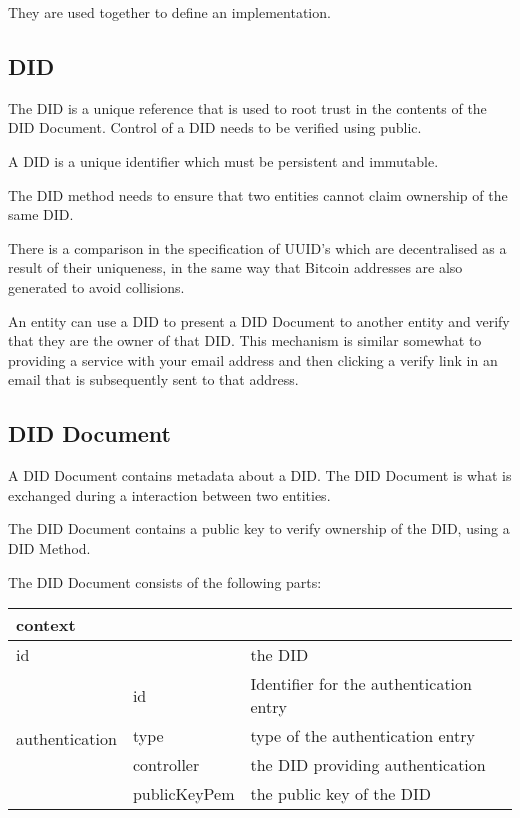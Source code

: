 \documentclass[10pt,a4paper]{runcrypto}
\begin{document}
They are used together to define an implementation.

\subsection{DID}
The DID is a unique reference that is used to root trust in the contents of the DID Document.  Control of a DID needs to be verified using public.

A DID is a unique identifier which must be persistent and immutable.

The DID method needs to ensure that two entities cannot claim ownership of the same DID.

There is a comparison in the specification of UUID's which are decentralised as a result of their uniqueness, in the same way that Bitcoin addresses are also generated to avoid collisions.

An entity can use a DID to present a DID Document to another entity and verify that they are the owner of that DID.  This mechanism is similar somewhat to providing a service with your email address and then clicking a verify link in an email that is subsequently sent to that address.

\subsection{DID Document}
A DID Document contains metadata about a DID.  The DID Document is what is exchanged during a interaction between two entities.

The DID Document contains a public key to verify ownership of the DID, using a DID Method.

The DID Document consists of the following parts: 
\begin{center}
	{\renewcommand{\arraystretch}{2}
		\begin{tabular}{ |p{2.5cm}|p{2.5cm}|p{6cm}| }
			\hline
			\multicolumn{2}{|l|}{context} &  \\
			\hline
			\multicolumn{2}{|l|}{id} & the DID \\
			\hline
			\multirow[t]{4}{*}{authentication} & id & Identifier for the authentication entry \\
			\cline{2-3}
			\cline{2-3} & type & type of the authentication entry \\
			\cline{2-3} & controller & the DID providing authentication \\
			\cline{2-3} & publicKeyPem & the public key of the DID \\
			\hline
		\end{tabular}
	}
\end{center}
\end{document}

